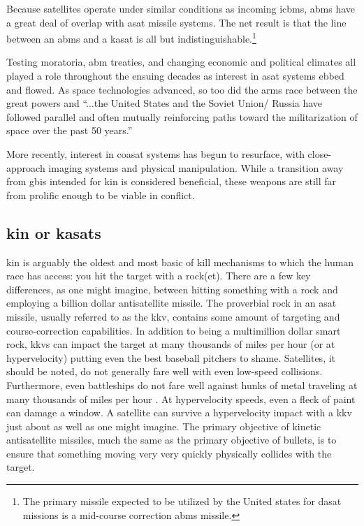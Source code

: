 Because satellites operate under similar conditions as incoming
\acp{icbm}, \acs{abms} have a great deal of overlap with \ac{asat}
missile systems.  The net result is that the line between an \ac{abms}
and a \ac{kasat} is all but indistinguishable.\footnote{The primary
missile expected to be utilized by the United states for \ac{dasat}
missions is a mid-course correction \ac{abms}
missile.\cite[p01-15]{brian}}

Testing moratoria\cite{xxx}, \ac{abm} treaties\cite{xxx}, and changing
economic\cite[boom]{xxx} and political\cite[fall of ussr]{xxx}
climates all played a role throughout the ensuing decades as interest
in \ac{asat} systems ebbed and flowed.\cite[xxx]{grego} As space
technologies advanced, so too did the arms race between the great
powers and ``...the United States and the Soviet Union/ Russia have
followed parallel and often mutually reinforcing paths toward the
militarization of space over the past 50 years.''\cite[p2]{grego}

More recently, interest in \ac{coasat} systems has begun to resurface,
with close-approach imaging systems \cite[the russian one maybe?]{xxx}
and physical manipulation.\cite[chinese one maybe?]{xxx} While a
transition away from \acp{gbi} intended for \ac{kin} is considered
beneficial, these weapons are still far from prolific enough to be
viable in conflict.

\subsection{\acf{kin} or \acfp{kasat}}

\acl{kin} is arguably the oldest and most basic of kill mechanisms to
which the human race has access: you hit the target with a
rock(et). There are a few key differences, as one might imagine,
between hitting something with a rock and employing a billion dollar
antisatellite missile.  The proverbial rock in an \ac{asat} missile,
usually referred to as the \acf{kkv}, contains some amount of
targeting and course-correction capabilities.\cite{sm3} In addition to
being a multimillion dollar smart rock, \acp{kkv} can impact the
target at many thousands of miles per hour (or at hypervelocity)
putting even the best baseball pitchers to shame.\cite[kkv impact
  simulation]{xxx} Satellites, it should be noted, do not generally
fare well with even low-speed collisions.\cite{whoopsies} Furthermore,
even battleships do not fare well against hunks of metal traveling at
many thousands of miles per hour \cite[any hypersonic paper]{xxx}.  At
hypervelocity speeds, even a fleck of paint can damage a
window.\cite[iss window]{xxx} A satellite can survive a hypervelocity
impact with a \ac{kkv} just about as well as one might
imagine.\cite[hypervelocity impact simulation]{xxx} The primary
objective of kinetic antisatellite missiles, much the same as the
primary objective of bullets, is to ensure that something moving very
very quickly physically collides with the target.\cite[needed?]{xxx}


